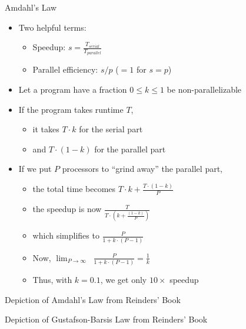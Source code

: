 \documentclass{beamer}
\begin{document}

\begin{frame}{Amdahl's Law}

  \begin{itemize}
  \item Two helpful terms:
    \begin{itemize}
    \item Speedup: $s = \frac{T_{serial}}{T_{parallel}}$
    \item Parallel efficiency: $s/p$ ($=1$ for $s=p$)
    \end{itemize}
  \item Let a program have a fraction $0\leq k\leq 1$  be non-parallelizable
  \item If the program takes runtime $T$, 
    \begin{itemize}
    \item it takes $T\cdot k$ for the serial part
    \item and $T\cdot (1-k)$ for the parallel part
    \end{itemize}
  \item If we put $P$ processors to ``grind away'' the parallel part,
    \begin{itemize}
    \item the total time becomes $T\cdot k + \frac{T\cdot (1-k)}{P}$
    \item the speedup is now $\frac{T}{T\cdot (k + \frac{(1-k)}{P})}$
    \item which simplifies to $\frac{P}{1+k\cdot(P-1)}$
    \item Now, $\displaystyle{\lim_{P \to \infty}}\;\; \frac{P}{1+k\cdot(P-1)} = \frac{1}{k}$
    \item Thus, with $k=0.1$, we get only $10\times$ speedup
    \end{itemize}
  \end{itemize}

\end{frame}



\begin{frame}{Depiction of Amdahl's Law from Reinders' Book}



\end{frame}


\begin{frame}{Depiction of Gustafson-Barsis Law from Reinders' Book}


\end{frame}
\end{document}
